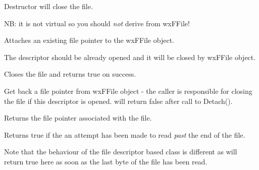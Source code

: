 





Destructor will close the file.

NB: it is not virtual so you should {\it not} derive from wxFFile!

\label{wxffileattach}


Attaches an existing file pointer to the wxFFile object.

The descriptor should be already opened and it will be closed by wxFFile
object.

\label{wxffileclose}


Closes the file and returns true on success.

\label{wxffiledetach}


Get back a file pointer from wxFFile object - the caller is responsible for closing the file if this
descriptor is opened.  will return false after call to Detach().

\label{wxffilefp}


Returns the file pointer associated with the file.

\label{wxffileeof}


Returns true if the an attempt has been made to read {\it past}
the end of the file. 

Note that the behaviour of the file descriptor based class
 is different as 
will return true here as soon as the last byte of the file has been
read.

